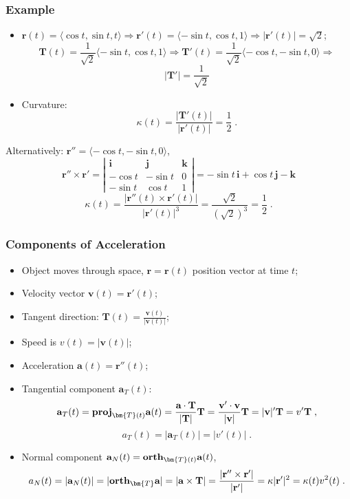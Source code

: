 \begin{frame}
  \frametitle{Example}
  
  \begin{itemize}
    \item $\textbf{r}(t) = \langle \cos{t}, \sin{t}, t\rangle \Longrightarrow \textbf{r}'(t) = \langle -\sin{t}, \cos{t}, 1 \rangle \Longrightarrow|\textbf{r}'(t)| = \sqrt{2}$;
%
$$\textbf{T}(t) = \frac{1}{\sqrt{2}}
\langle -\sin{t}, \cos{t}, 1 \rangle
\Longrightarrow
\textbf{T}'(t) = \frac{1}{\sqrt{2}}
\langle -\cos{t}, -\sin{t}, 0 \rangle
\Longrightarrow $$
$$|\textbf{T}'|=\frac{1}{\sqrt{2}}$$
 \item Curvature:
%
$$\kappa(t) = \frac{|\textbf{T}'(t)|}{|\textbf{r}'(t)|} =
\frac{1}{2}\; .$$ 
  \end{itemize}

Alternatively: $\textbf{r}''= \langle -\cos{t}, -\sin{t}, 0 \rangle$,
%
$$\textbf{r}'' \times \textbf{r}' = \left|
\begin{array}{ccc}
\textbf{i} & \textbf{j} & \textbf{k} \\
-\cos{t}&  -\sin{t}&  0 \\
-\sin{t}& \cos{t}& 1
\end{array}
\right| = -\sin{t} \, \textbf{i} +
\cos{t}\, \textbf{j} -\textbf{k} $$
%
$$\kappa(t) =
\frac{|\textbf{r}''(t) \times \textbf{r}'(t)|}
{|\textbf{r}'(t)|^3} =
\frac{\sqrt{2}}{(\sqrt{2})^3} = \frac{1}{2}\; .$$

\end{frame}

\begin{frame}
  \frametitle{Components of Acceleration}
  
  \begin{itemize}
    \item Object moves through space, $\textbf{r}=\textbf{r}(t)$ position vector at time $t$;
    \item Velocity vector $\textbf{v}(t) = \textbf{r}'(t)$; 
    \item Tangent direction: $\textbf{T}(t) = \frac{\textbf{v}(t)}{|\textbf{v}(t)|}$;
    \item Speed is $v(t) = |\textbf{v}(t)|$;
    \item Acceleration $\textbf{a}(t) = \textbf{r}''(t)$;
    \item Tangential component $\textbf{a}_T(t)$:
%
$$\textbf{a}_T(t) =
\textbf{\text{proj}}_{\bm{T}(t)} \textbf{a}(t) =
\frac{\textbf{a}\cdot \textbf{T}}{|\textbf{T}|}
\textbf{T} = \frac{\textbf{v}'\cdot \textbf{v}}
{|\textbf{v}|} \textbf{T} =
|\textbf{v}|' \textbf{T} = v' \textbf{T}\;,$$
%
$$a_T(t) = |\textbf{a}_T(t)| = |v'(t)|\; .$$

\item Normal component $\textbf{a}_N(t)=\textbf{\text{orth}}_{\bm{T}(t)} \textbf{a}(t)$,
%
$$a_N(t) = |\textbf{a}_N(t)| = |\textbf{\text{orth}}_{\bm{T}} \textbf{a}| =
|\textbf{a} \times \textbf{T}| =
\frac{|\textbf{r}'' \times \textbf{r}'|}
{|\textbf{r}'|} = \kappa |\textbf{r}'|^2 =
\kappa(t) v^2(t)  \; .$$
  \end{itemize}

\end{frame}

